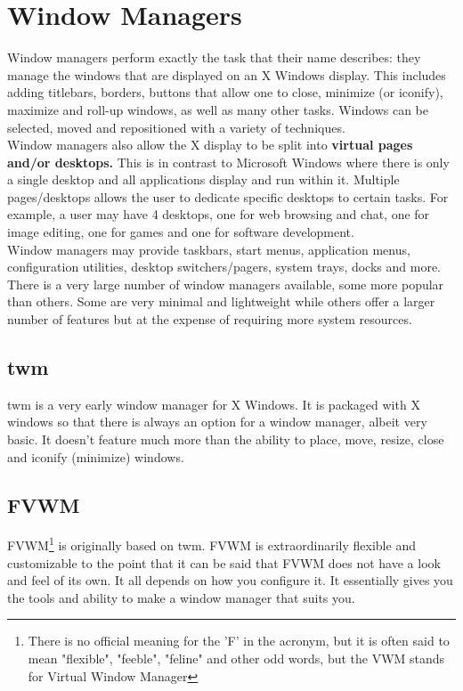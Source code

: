 \section{Window Managers}

Window managers perform exactly the task that their name describes: they manage the windows that are displayed on an X Windows display.  This includes adding titlebars, borders, buttons that allow one to close, minimize (or iconify), maximize and roll-up windows, as well as many other tasks.  Windows can be selected, moved and repositioned with a variety of techniques.\\

Window managers also allow the X display to be split into \textbf{virtual pages and/or desktops.}  This is in contrast to Microsoft Windows where there is only a single desktop and all applications display and run within it.  Multiple pages/desktops allows the user to dedicate specific desktops to certain tasks.  For example, a user may have 4 desktops, one for web browsing and chat, one for image editing, one for games and one for software development.\\

Window managers may provide taskbars, start menus, application menus, configuration utilities, desktop switchers/pagers, system trays, docks and more.\\

There is a very large number of window managers available, some more popular than others.  Some are very minimal and lightweight while others offer a larger number of features but at the expense of requiring more system resources.

\subsection{twm}

twm is a very early window manager for X Windows.  It is packaged with X windows so that there is always an option for a window manager, albeit very basic.  It doesn't feature much more than the ability to place, move, resize, close and iconify (minimize) windows.

\subsection{FVWM}

FVWM\footnote{There is no official meaning for the 'F' in the acronym, but it is often said to mean "flexible", "feeble", "feline" and other odd words, but the VWM stands for Virtual Window Manager} is originally based on twm.  FVWM is extraordinarily flexible and customizable to the point that it can be said that FVWM does not have a look and feel of its own.  It all depends on how you configure it.  It essentially gives you the tools and ability to make a window manager that suits you.\\

